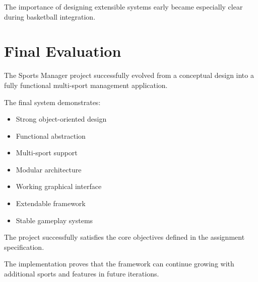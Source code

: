 \documentclass[11pt,a4paper]{article}
\begin{document}
The importance of designing extensible systems early became especially clear during basketball integration.

\section{Final Evaluation}

The Sports Manager project successfully evolved from a conceptual design into a fully functional multi-sport management application.

The final system demonstrates:
\begin{itemize}
\item Strong object-oriented design
\item Functional abstraction
\item Multi-sport support
\item Modular architecture
\item Working graphical interface
\item Extendable framework
\item Stable gameplay systems
\end{itemize}

The project successfully satisfies the core objectives defined in the assignment specification.

The implementation proves that the framework can continue growing with additional sports and features in future iterations.
\end{document}

